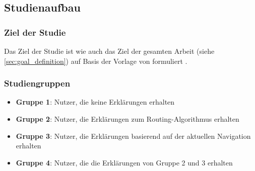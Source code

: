 \subsection{Studienaufbau}

\subsubsection{Ziel der Studie}

Das Ziel der Studie ist wie auch das Ziel der gesamten Arbeit (siehe \autoref{sec:goal_definition}) auf Basis der Vorlage von \citeauthor{wohlin2012experimentation} formuliert \cite{wohlin2012experimentation}.

\noindent{}

\subsubsection*{Studiengruppen}

\begin{itemize}
    \item \textbf{Gruppe 1}: Nutzer, die keine Erklärungen erhalten
    \item \textbf{Gruppe 2}: Nutzer, die Erklärungen zum Routing-Algorithmus erhalten
    \item \textbf{Gruppe 3}: Nutzer, die Erklärungen basierend auf der aktuellen Navigation erhalten
    \item \textbf{Gruppe 4}: Nutzer, die die Erklärungen von Gruppe 2 und 3 erhalten
\end{itemize}